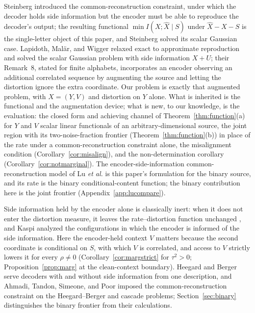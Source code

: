 \documentclass[11pt,onecolumn]{IEEEtran}
\newcommand{\hX}{\widehat{X}}
\begin{document}
Steinberg \cite{steinberg2009} introduced the common-reconstruction
constraint, under which the decoder holds side information but the
encoder must be able to reproduce the decoder's output; the resulting
functional $\min I(X;\hX\mid S)$ under $\hX-X-S$ is the single-letter
object of this paper, and Steinberg solved its scalar Gaussian case.
Lapidoth, Mal\"ar, and Wigger \cite{lapidoth2014} relaxed exact to
approximate reproduction and solved the scalar Gaussian problem with
side information $X+U$; their Remark~8, stated for finite alphabets,
incorporates an encoder observing an additional correlated sequence by
augmenting the source and letting the distortion ignore the extra
coordinate. Our problem is exactly that augmented problem, with
$X=(Y,V)$ and distortion on $Y$ alone. What is inherited is the
functional and the augmentation device; what is new, to our knowledge,
is the evaluation: the closed form and achieving channel of
Theorem~\ref{thm:function}(a) for $Y$ and $V$ scalar linear functionals
of an arbitrary-dimensional source, the joint region with its
two-noise-fraction frontier (Theorem~\ref{thm:function}(b)) in place of
the rate under a common-reconstruction constraint alone, the
misalignment condition (Corollary~\ref{cor:misalign}), and the
non-determination corollary (Corollary~\ref{cor:notmarginal}). The
encoder-side-information common-reconstruction model of Lu \emph{et al.}
\cite{lu2016lossy,lu2016binary} is this paper's formulation for the
binary source, and its rate is the binary conditional-content function;
the binary contribution here is the joint frontier
(Appendix~\ref{app:lucompare}).

Side information held by the encoder alone is classically inert: when
it does not enter the distortion measure, it leaves the rate--distortion
function unchanged \cite{berger1971}, and Kaspi \cite{kaspi1994}
analyzed the configurations in which the encoder is informed of the
side information. Here the encoder-held context $V$ matters because the
second coordinate is conditional on $S$, with which $V$ is correlated,
and access to $V$ strictly lowers it for every $\rho\ne0$
(Corollary~\ref{cor:margstrict} for $\tau^2>0$;
Proposition~\ref{prop:marg} at the clean-context boundary). Heegard and Berger
\cite{heegardberger1985} serve decoders with and without side
information from one description, and Ahmadi, Tandon, Simeone, and
Poor \cite{ahmadi2013} imposed the common-reconstruction constraint on
the Heegard--Berger and cascade problems; Section~\ref{sec:binary}
distinguishes the binary frontier from their calculations.
\end{document}
